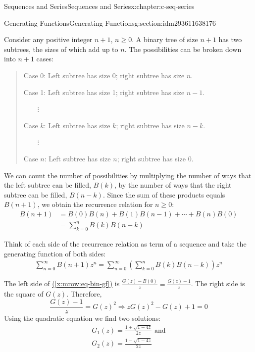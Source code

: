 \documentclass[twoside,10pt,]{book}
\newcommand{\xreffont}{\relax}
\numberwithin{equation}{section}
\begin{document}
\begin{chapterptx}{Sequences and Series}{}{Sequences and Series}{}{}{x:chapter:c-seq-series}
\begin{sectionptx}{Generating Functions}{}{Generating Functions}{}{}{g:section:idm293611638176}
\par
Consider any positive integer \(n + 1\), \(n \geq  0\). A binary tree of size \(n + 1\) has two subtrees, the sizes of which add up to \(n\). The possibilities can be broken down into \(n + 1\) cases:%
\begin{quote}%
Case 0: Left subtree has size 0; right subtree has size \(n\).%
\par
Case 1: Left subtree has size 1; right subtree has size \(n - 1\).%
\par
\(\quad \quad \)\(\vdots\)%
\par
Case \(k\): Left subtree has size \(k\); right subtree has size \(n - k\).%
\par
\(\quad \quad \)\(\vdots\)%
\par
Case \(n\): Left subtree has size \(n\); right subtree has size 0.%
\end{quote}
We can count the number of possibilities by multiplying the number of ways that the left subtree can be filled, \(B(k)\), by the number of ways that the right subtree can be filled, \(B(n-k)\). Since the sum of these products equals \(B(n + 1)\), we obtain the recurrence relation for \(n\geq 0\):%
\begin{equation*}
\begin{split}
B(n+1) &= B(0)B(n)+ B(1)B(n-1)+ \cdots  + B(n)B(0)\\
&=\sum_{k=0}^n B(k) B(n-k)
\end{split} 
\end{equation*}
%
\par
Think of each side of the recurrence relation as term of a sequence and take the generating function of both sides:%
\begin{gather}
\sum_{n=0}^{\infty } B(n+1) z^n= \sum_{n=0}^{\infty }  \left(\sum_{k=0}^n B(k) B(n-k)\right)z^n\label{x:mrow:eq-bin-gf}
\end{gather}
%
\par
The left side of \hyperref[x:mrow:eq-bin-gf]{({\xreffont\ref{x:mrow:eq-bin-gf}})} is  \(\frac{G(z)-B(0)}{z}=\frac{G(z)-1}{z}\). The right side is the square of \(G(z)\). Therefore,%
\begin{equation*}
\frac{G(z)-1}{z}= G(z)^2  \Rightarrow  z G(z)^2- G(z) + 1 = 0
\end{equation*}
Using the quadratic equation we find two solutions:%
\begin{gather}
G_1(z) = \frac{1+\sqrt{1-4 z}}{2z} \textrm{ and}\label{g:mrow:idm293611614304}\\
G_2(z) = \frac{1-\sqrt{1-4 z}}{2z}\label{g:mrow:idm293611614016}

\end{gather}
\end{sectionptx}
\end{chapterptx}
\end{document}
